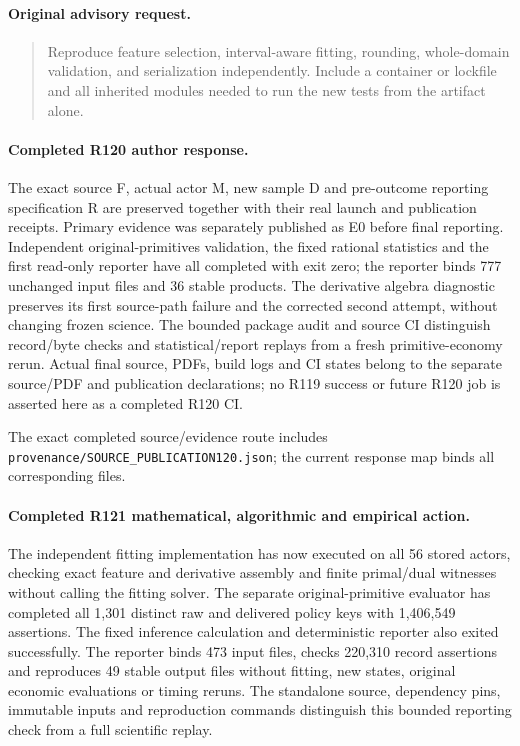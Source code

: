 \paragraph{Original advisory request.}
\begin{quote}
Reproduce feature selection, interval-aware fitting, rounding, whole-domain validation, and serialization independently. Include a container or lockfile and all inherited modules needed to run the new tests from the artifact alone.
\end{quote}

\paragraph{Completed R120 author response.}
The exact source F, actual actor M, new sample D and pre-outcome reporting specification R are preserved together with their real launch and publication receipts. Primary evidence was separately published as E0 before final reporting. Independent original-primitives validation, the fixed rational statistics and the first read-only reporter have all completed with exit zero; the reporter binds 777 unchanged input files and 36 stable products. The derivative algebra diagnostic preserves its first source-path failure and the corrected second attempt, without changing frozen science. The bounded package audit and source CI distinguish record/byte checks and statistical/report replays from a fresh primitive-economy rerun. Actual final source, PDFs, build logs and CI states belong to the separate source/PDF and publication declarations; no R119 success or future R120 job is asserted here as a completed R120 CI.

The exact completed source/evidence route includes \nolinkurl{provenance/SOURCE_PUBLICATION120.json}; the current response map binds all corresponding files.

\paragraph{Completed R121 mathematical, algorithmic and empirical action.}
The independent fitting implementation has now executed on all 56 stored actors, checking exact feature and derivative assembly and finite primal/dual witnesses without calling the fitting solver. The separate original-primitive evaluator has completed all 1,301 distinct raw and delivered policy keys with 1,406,549 assertions. The fixed inference calculation and deterministic reporter also exited successfully. The reporter binds 473 input files, checks 220,310 record assertions and reproduces 49 stable output files without fitting, new states, original economic evaluations or timing reruns. The standalone source, dependency pins, immutable inputs and reproduction commands distinguish this bounded reporting check from a full scientific replay.

